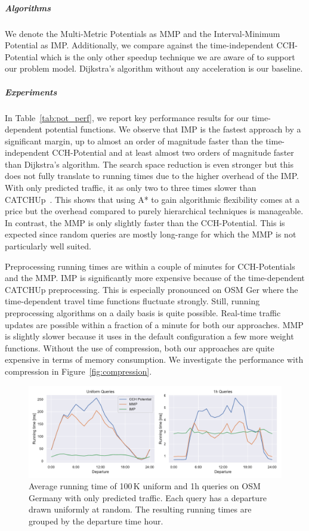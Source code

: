 \documentclass[a4paper,UKenglish,cleveref, autoref, thm-restate,anonymous]{lipics-v2021}
\begin{document}
\subparagraph{Algorithms}
We denote the Multi-Metric Potentials as MMP and the Interval-Minimum Potential as IMP.
Additionally, we compare against the time-independent CCH-Potential which is the only other speedup technique we are aware of to support our problem model.
Dijkstra's algorithm without any acceleration is our baseline.

\subparagraph{Experiments} In Table~\ref{tab:pot_perf}, we report key performance results for our time-dependent potential functions.
We observe that IMP is the fastest approach by a significant margin, up to almost an order of magnitude faster than the time-independent CCH-Potential and at least almost two orders of magnitude faster than Dijkstra's algorithm.
The search space reduction is even stronger but this does not fully translate to running times due to the higher overhead of the IMP.
With only predicted traffic, it as only two to three times slower than CATCHUp~\cite{swz-sfert-21}.
This shows that using A* to gain algorithmic flexibility comes at a price but the overhead compared to purely hierarchical techniques is manageable.
In contrast, the MMP is only slightly faster than the CCH-Potential.
This is expected since random queries are mostly long-range for which the MMP is not particularly well suited.

Preprocessing running times are within a couple of minutes for CCH-Potentials and the MMP.
IMP is significantly more expensive because of the time-dependent CATCHUp preprocessing.
This is especially pronounced on OSM Ger where the time-dependent travel time functions fluctuate strongly.
Still, running preprocessing algorithms on a daily basis is quite possible.
Real-time traffic updates are possible within a fraction of a minute for both our approaches.
MMP is slightly slower because it uses in the default configuration a few more weight functions.
Without the use of compression, both our approaches are quite expensive in terms of memory consumption.
We investigate the performance with compression in Figure~\ref{fig:compression}.

\begin{figure}
\centering
\includegraphics[width=\linewidth]{fig/perf_over_day.pdf}
\caption{
Average running time of 100\,K uniform and 1h queries on OSM Germany with only predicted traffic.
Each query has a departure drawn uniformly at random.
The resulting running times are grouped by the departure time hour.
}\label{fig:by_dep}
\end{figure}
\end{document}
